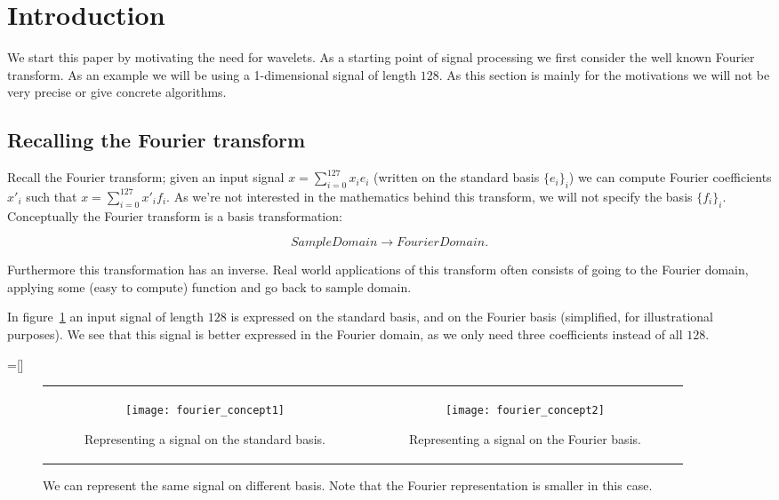 
\section{Introduction}
\label{sec:intro}
We start this paper by motivating the need for wavelets. As a starting point of signal processing we first consider the well known Fourier transform. As an example we will be using a 1-dimensional signal of length $128$. As this section is mainly for the motivations we will not be very precise or give concrete algorithms.

\subsection{Recalling the Fourier transform}
Recall the Fourier transform; given an input signal $x = \sum_{i=0}^{127} x_i e_i$ (written on the standard basis $\{e_i\}_i$) we can compute Fourier coefficients $x'_i$ such that $x = \sum_{i=0}^{127} x'_i f_i$. As we're not interested in the mathematics behind this transform, we will not specify the basis $\{f_i\}_i$. Conceptually the Fourier transform is a basis transformation:

$$ SampleDomain \to FourierDomain. $$

Furthermore this transformation has an inverse. Real world applications of this transform often consists of going to the Fourier domain, applying some (easy to compute) function and go back to sample domain.

In figure~\ref{fig:fourier_concepts} an input signal of length $128$ is expressed on the standard basis, and on the Fourier basis (simplified, for illustrational purposes). We see that this signal is better expressed in the Fourier domain, as we only need three coefficients instead of all $128$.

=[]
\begin{figure}
	\begin{tabular}{c|c}
	\begin{subfigure}[b]{0.5\textwidth}
		\centering
		\texttt{[image: fourier\_concept1]}
		\caption{Representing a signal on the standard basis.}
	\end{subfigure}&
	\begin{subfigure}[b]{0.5\textwidth}
		\centering
		\texttt{[image: fourier\_concept2]}
		\caption{Representing a signal on the Fourier basis.}
	\end{subfigure}
	\end{tabular}
	\caption{We can represent the same signal on different basis. Note that the Fourier representation is smaller in this case.}
	\label{fig:fourier_concepts}
\end{figure}

